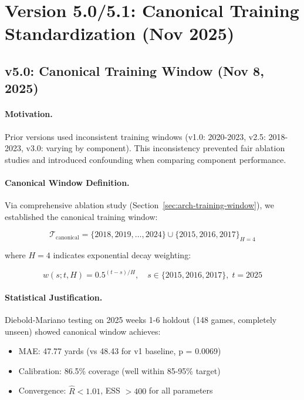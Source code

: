 \section{Version 5.0/5.1: Canonical Training Standardization (Nov 2025)}
\label{sec:arch-v5}

\subsection{v5.0: Canonical Training Window (Nov 8, 2025)}

\paragraph{Motivation.}
Prior versions used inconsistent training windows (v1.0: 2020-2023, v2.5: 2018-2023, v3.0: varying by component). This inconsistency prevented fair ablation studies and introduced confounding when comparing component performance.

\paragraph{Canonical Window Definition.}
Via comprehensive ablation study (Section~\ref{sec:arch-training-window}), we established the canonical training window:

\begin{equation}
\mathcal{T}_{\text{canonical}} = \{2018, 2019, \ldots, 2024\} \cup \{2015, 2016, 2017\}_{H=4}
\end{equation}

\noindent where $H=4$ indicates exponential decay weighting:

\begin{equation}
\label{eq:decay-weights}
w(s; t, H) = 0.5^{(t - s)/H}, \quad s \in \{2015, 2016, 2017\}, \; t = 2025
\end{equation}

\paragraph{Statistical Justification.}
Diebold-Mariano testing on 2025 weeks 1-6 holdout (148 games, completely unseen) showed canonical window achieves:
\begin{itemize}[itemsep=2pt,parsep=0pt]
    \item MAE: 47.77 yards (vs 48.43 for v1 baseline, p = 0.0069)
    \item Calibration: 86.5\% coverage (well within 85-95\% target)
    \item Convergence: $\hat{R} < 1.01$, ESS $> 400$ for all parameters
\end{itemize}

